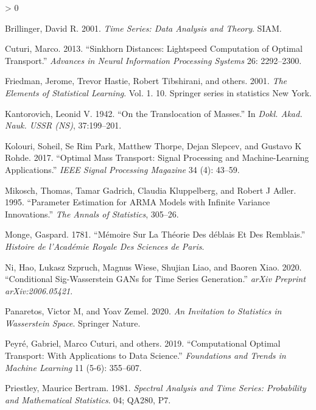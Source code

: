 \documentclass[
  11pt,
]{article}
\newlength{\cslhangindent}
\newenvironment{CSLReferences}[2] %
 {%
  \setlength{\parindent}{0pt}
  \ifodd #1 \everypar{\setlength{\hangindent}{\cslhangindent}}\ignorespaces\fi
  \ifnum #2 > 0
  \setlength{\parskip}{#2\baselineskip}
  \fi
 }%
 {}
\begin{document}
\begin{CSLReferences}{1}{0}
\leavevmode\hypertarget{ref-brillinger2001time}{}%
Brillinger, David R. 2001. \emph{Time Series: Data Analysis and Theory}.
SIAM.

\leavevmode\hypertarget{ref-cuturi2013sinkhorn}{}%
Cuturi, Marco. 2013. {``Sinkhorn Distances: Lightspeed Computation of
Optimal Transport.''} \emph{Advances in Neural Information Processing
Systems} 26: 2292--2300.

\leavevmode\hypertarget{ref-friedman2001elements}{}%
Friedman, Jerome, Trevor Hastie, Robert Tibshirani, and others. 2001.
\emph{The Elements of Statistical Learning}. Vol. 1. 10. Springer series
in statistics New York.

\leavevmode\hypertarget{ref-kantorovich1942translocation}{}%
Kantorovich, Leonid V. 1942. {``On the Translocation of Masses.''} In
\emph{Dokl. Akad. Nauk. USSR (NS)}, 37:199--201.

\leavevmode\hypertarget{ref-kolouri2017optimal}{}%
Kolouri, Soheil, Se Rim Park, Matthew Thorpe, Dejan Slepcev, and Gustavo
K Rohde. 2017. {``Optimal Mass Transport: Signal Processing and
Machine-Learning Applications.''} \emph{IEEE Signal Processing Magazine}
34 (4): 43--59.

\leavevmode\hypertarget{ref-mikosch1995parameter}{}%
Mikosch, Thomas, Tamar Gadrich, Claudia Kluppelberg, and Robert J Adler.
1995. {``Parameter Estimation for ARMA Models with Infinite Variance
Innovations.''} \emph{The Annals of Statistics}, 305--26.

\leavevmode\hypertarget{ref-monge1781memoire}{}%
Monge, Gaspard. 1781. {``M{é}moire Sur La Th{é}orie Des d{é}blais Et Des
Remblais.''} \emph{Histoire de l'Acad{é}mie Royale Des Sciences de
Paris}.

\leavevmode\hypertarget{ref-ni2020conditional}{}%
Ni, Hao, Lukasz Szpruch, Magnus Wiese, Shujian Liao, and Baoren Xiao.
2020. {``Conditional Sig-Wasserstein GANs for Time Series Generation.''}
\emph{arXiv Preprint arXiv:2006.05421}.

\leavevmode\hypertarget{ref-panaretos2020invitation}{}%
Panaretos, Victor M, and Yoav Zemel. 2020. \emph{An Invitation to
Statistics in Wasserstein Space}. Springer Nature.

\leavevmode\hypertarget{ref-peyre2019computational}{}%
Peyré, Gabriel, Marco Cuturi, and others. 2019. {``Computational Optimal
Transport: With Applications to Data Science.''} \emph{Foundations and
Trends in Machine Learning} 11 (5-6): 355--607.


\leavevmode\hypertarget{ref-priestley1981spectral}{}%
Priestley, Maurice Bertram. 1981. \emph{Spectral Analysis and Time
Series: Probability and Mathematical Statistics}. 04; QA280, P7.


\end{CSLReferences}
\end{document}
